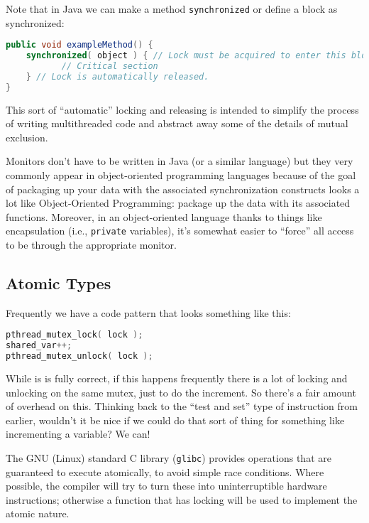Note that in Java we can make a method \texttt{synchronized} or define a block as synchronized:

\begin{lstlisting}[language=Java]
public void exampleMethod() {
    synchronized( object ) { // Lock must be acquired to enter this block
           // Critical section 
    } // Lock is automatically released.
}
\end{lstlisting}

This sort of ``automatic'' locking and releasing is intended to simplify the process of writing multithreaded code and abstract away some of the details of mutual exclusion.

Monitors don't have to be written in Java (or a similar language) but they very commonly appear in object-oriented programming languages because of the goal of packaging up your data with the associated synchronization constructs looks a lot like Object-Oriented Programming: package up the data with its associated functions. Moreover, in an object-oriented language thanks to things like encapsulation (i.e., \texttt{private} variables), it's somewhat easier to ``force'' all access to be through the appropriate monitor.

\subsection*{Atomic Types}

Frequently we have a code pattern that looks something like this:

\begin{lstlisting}[language=C]
pthread_mutex_lock( lock );
shared_var++;
pthread_mutex_unlock( lock );
\end{lstlisting}

While is is fully correct, if this happens frequently there is a lot of locking and unlocking on the same mutex, just to do the increment. So there's a fair amount of overhead on this. Thinking back to the ``test and set'' type of instruction from earlier, wouldn't it be nice if we could do that sort of thing for something like incrementing a variable? We can!

The GNU (Linux) standard C library (\texttt{glibc}) provides operations that are guaranteed to execute atomically, to avoid simple race conditions. Where possible, the compiler will try to turn these into uninterruptible hardware instructions; otherwise a function that has locking will be used to implement the atomic nature.


